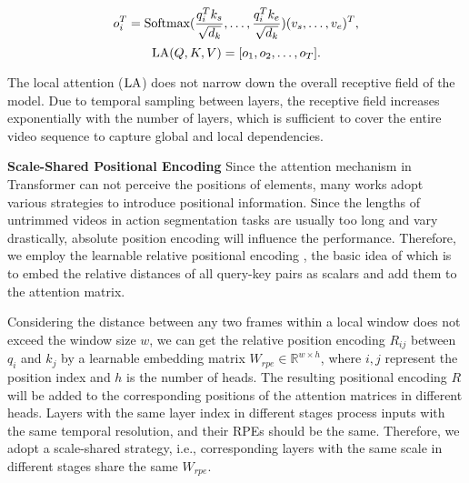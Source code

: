 \documentclass[letterpaper]{article} \usepackage[submission]{aaai23}  \usepackage{times}  \usepackage{helvet}  \usepackage{courier}  \usepackage[hyphens]{url}  \usepackage{graphicx} \urlstyle{rm} \def\UrlFont{\rm}  \usepackage{natbib}  \usepackage{caption} \frenchspacing  \setlength{\pdfpagewidth}{8.5in} \setlength{\pdfpageheight}{11in} \usepackage{algorithm}
\begin{document}
\begin{equation}
o_i^T = \textup{Softmax}(\frac{q_i^T k_s}{\sqrt{d_k}},\ldots,\frac{q_i^T k_e}{\sqrt{d_k}})(v_s,\ldots,v_e)^T,
\end{equation}
\begin{equation}
\label{eq:localattention}
\textup{LA}(Q,K,V) = [o_1, o_2, \ldots, o_T].
\end{equation}


The local attention ($\textup{LA}$) does not narrow down the overall receptive field of the model. Due to temporal sampling between layers, the receptive field increases exponentially with the number of layers, which is sufficient to cover the entire video sequence to capture global and local dependencies. 


\textbf{Scale-Shared Positional Encoding}\quad
Since the attention mechanism in Transformer can not perceive the positions of elements, many works \cite{dai2019transformer, ke2020rethinking} adopt various strategies to introduce positional information. Since the lengths of untrimmed videos in action segmentation tasks are usually too long and vary drastically, absolute position encoding will influence the performance. Therefore, we employ the learnable relative positional encoding \cite{shaw2018self}, the basic idea of which is to embed the relative distances of all query-key pairs as scalars and add them to the attention matrix.

Considering the distance between any two frames within a local window does not exceed the window size $w$, we can get the relative position encoding $R_{ij}$ between $q_i$ and $k_j$ by a learnable embedding matrix $W_{rpe}\in \mathbb{R}^{w \times h}$, where $i,j$ represent the position index and $h$ is the number of heads. The resulting positional encoding $R$ will be added to the corresponding positions of the attention matrices in different heads. Layers with the same layer index in different stages process inputs with the same temporal resolution, and their RPEs should be the same. Therefore, we adopt a scale-shared strategy, i.e., corresponding layers with the same scale in different stages share the same $W_{rpe}$. 
\end{document}

